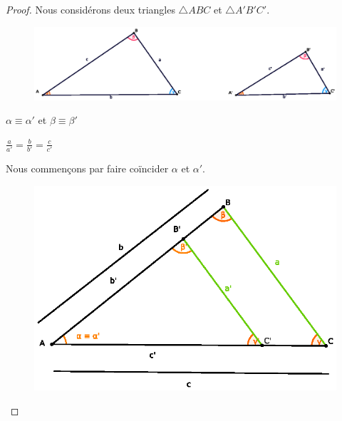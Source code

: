 \documentclass[a4paper,12pt]{article}
\begin{document}
\begin{proof}
Nous considérons deux triangles $\triangle ABC$ et $\triangle A'B'C'$.

\begin{figure}[H]
        \centering
        \includegraphics[scale=1]{similitude.eps}
    \end{figure}

\begin{hyp}
$\alpha \equiv \alpha'$ et $\beta \equiv \beta'$
\end{hyp}

\begin{concl}
$\frac{a}{a'} = \frac{b}{b'} = \frac{c}{c'}$
\end{concl}

Nous commençons par faire coïncider $\alpha$ et $\alpha '$.\\

\begin{figure}[H]
        \centering
        \includegraphics[scale=1]{similitude1-1.eps}
    \end{figure}


\end{proof}
\end{document}
